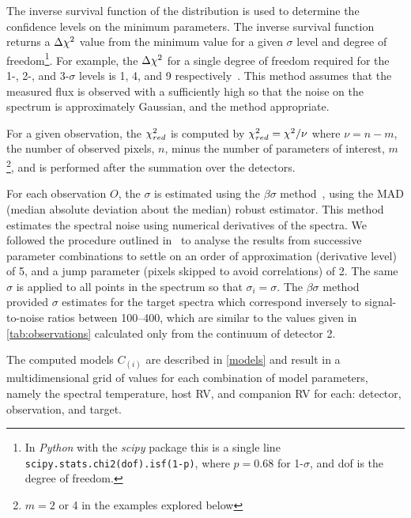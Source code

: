 The inverse survival function of the \textchisquared{} distribution is used to determine the confidence levels on the minimum \textchisquared{} parameters.
The inverse survival function returns a \(\Delta{\chi}^{2}\) value from the minimum \textchisquared{} value for a given $\sigma$ level and degree of freedom\footnote{In \emph{Python} with the \emph{scipy} package this is a single line \texttt{scipy.stats.chi2{(dof)}.isf{(1-p)}}, where \(p = 0.68\) for 1-\(\sigma\), and dof is the degree of freedom.}.
For example, the \(\Delta {\chi}^{2}\) for a single degree of freedom required for the 1-, 2-, and 3-\(\sigma\) levels is 1, 4, and 9 respectively~\citep{bevington_data_2003}.
This method assumes that the measured flux is observed with a \snr{} sufficiently high so that the noise on the spectrum is approximately Gaussian, and the \textchisquared{} method appropriate.

For a given observation, the \({\chi}^{2}_{red}\) is computed by \({\chi}^{2}_{red} = {\chi}^{2} / \nu\) where \(\nu = n - m\), the number of observed pixels, \(n\), minus the number of parameters of interest, \(m\)\footnote{\(m=2\) or 4 in the examples explored below}, and is performed after the summation over the detectors.


For each observation $O$, the \(\sigma\) is estimated using the \(\beta\sigma\) method~\citep{czesla_posteriori_2018}, using the MAD (median absolute deviation about the median) robust estimator. This method estimates the spectral noise using numerical derivatives of the spectra.
We followed the procedure outlined in~\citet{czesla_posteriori_2018} to analyse the results from successive parameter combinations to settle on an order of approximation (derivative level) of 5, and a jump parameter (pixels skipped to avoid correlations) of 2. The same \(\sigma\) is applied to all points in the spectrum so that \({\sigma}_{i} = \sigma\).
The \(\beta\sigma\) method provided \(\sigma\) estimates for the target spectra which correspond inversely to signal-to-noise ratios between 100--400, which are similar to the values given in \cref{tab:observations} calculated only from the continuum of detector 2.

The computed models $C_(i)$ are described in \cref{models} and result in a multidimensional grid  of \textchisquared{} values for each combination of model parameters, namely the spectral temperature, host {RV}, and companion {RV} for each: detector, observation, and target.

